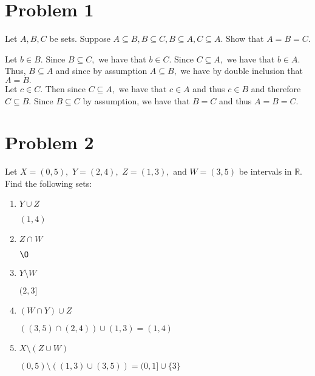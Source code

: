 \documentclass[11pt]{article}
\newcommand{\bbR}{\mathbb{R}}
\renewcommand{\emptyset}{\O}
\newcommand{\sm}{\setminus}
\begin{document}
	
	
	\psetheader
\section*{Problem 1}
\begin{problem}
    Let $A, B, C$ be sets. Suppose $A\subseteq B, B\subseteq C, B\subseteq A, C\subseteq A.$ Show that $A = B = C.$
\end{problem}
\begin{solution}
    Let $b\in B.$ Since $B\subseteq C,$ we have that $b\in C.$ Since $C\subseteq A,$ we have that $b\in A.$ Thus, $B\subseteq A$ and since by assumption $A\subseteq B,$ we have by double inclusion that $A = B.$\\
    Let $c\in C.$ Then since $C\subseteq A,$ we have that $c\in A$ and thus $c\in B$ and therefore $C\subseteq B.$ Since $B\subseteq C$ by assumption, we have that $B = C$ and thus $A = B = C.$
\end{solution}

\newpage
\section*{Problem 2}
\begin{problem}
Let $X = (0,5),$ $Y = (2,4),$ $Z = (1,3),$ and $W = (3,5)$ be intervals in $\bbR.$ Find the following sets:
\begin{enumerate}
    \item $Y \cup Z$
    \begin{solution}
        $(1,4)$
    \end{solution}
    \item $Z \cap W$
    \begin{solution}
        $\emptyset$
    \end{solution}
    \item $Y\sm W$
    \begin{solution}
        $(2,3]$
    \end{solution}
    \item $(W\cap Y) \cup Z$
    \begin{solution}
        $((3,5) \cap (2,4)) \cup (1,3) = (1,4)$
    \end{solution}
    \item $X \sm (Z \cup W)$
    \begin{solution}
        $(0,5)\sm ((1,3)\cup (3,5)) = (0,1] \cup \{3\}$
    \end{solution}
\end{enumerate}
\end{problem}
\end{document}
